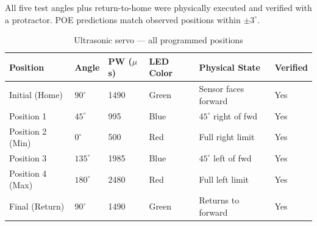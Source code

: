 \documentclass[12pt,a4paper]{article}
\begin{document}
\begin{donebox}{}
All five test angles plus return-to-home were physically executed and verified
with a protractor. POE predictions match observed positions within $\pm 3^\circ$.
\end{donebox}

\begin{table}[h!]
\centering
\caption{Ultrasonic servo --- all programmed positions}
\renewcommand{\arraystretch}{1.3}
\begin{tabularx}{\linewidth}{L{2.5cm} C{1.5cm} C{1.8cm} C{2cm} L{3.5cm} C{2cm}}
\toprule
{}
\color{white}\textbf{Position} &
\color{white}\textbf{Angle} &
\color{white}\textbf{PW ($\mu$s)} &
\color{white}\textbf{LED Color} &
\color{white}\textbf{Physical State} &
\color{white}\textbf{Verified} \\
\midrule
Initial (Home) & $90^\circ$ & 1490 & Green & Sensor faces forward & \color{SuccessGreen}Yes \\
Position 1 & $45^\circ$ & 995 & Blue & $45^\circ$ right of fwd & \color{SuccessGreen}Yes \\
Position 2 (Min) & $0^\circ$ & 500 & Red & Full right limit & \color{SuccessGreen}Yes \\
Position 3 & $135^\circ$ & 1985 & Blue & $45^\circ$ left of fwd & \color{SuccessGreen}Yes \\
Position 4 (Max) & $180^\circ$ & 2480 & Red & Full left limit & \color{SuccessGreen}Yes \\
Final (Return) & $90^\circ$ & 1490 & Green & Returns to forward & \color{SuccessGreen}Yes \\
\bottomrule
\end{tabularx}
\end{table}
\end{document}

